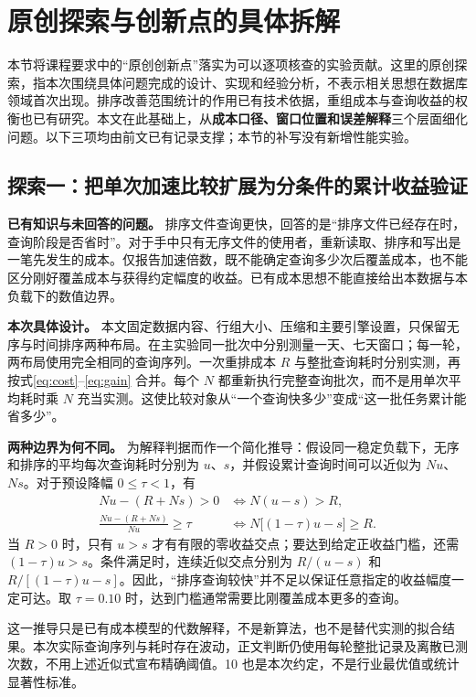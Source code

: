 \section{原创探索与创新点的具体拆解}
\label{sec:innovation}
本节将课程要求中的“原创创新点”落实为可以逐项核查的实验贡献。这里的原创探索，指本次围绕具体问题完成的设计、实现和经验分析，不表示相关思想在数据库领域首次出现。排序改善范围统计的作用已有技术依据，重组成本与查询收益的权衡也已有研究\cite{duckdb,rong}。本文在此基础上，从\textbf{成本口径、窗口位置和误差解释}三个层面细化问题。以下三项均由前文已有记录支撑；本节的补写没有新增性能实验。

\subsection{探索一：把单次加速比较扩展为分条件的累计收益验证}
\label{sec:innovation-cost}
\textbf{已有知识与未回答的问题。}
排序文件查询更快，回答的是“排序文件已经存在时，查询阶段是否省时”。对于手中只有无序文件的使用者，重新读取、排序和写出是一笔先发生的成本。仅报告加速倍数，既不能确定查询多少次后覆盖成本，也不能区分刚好覆盖成本与获得约定幅度的收益。已有成本思想不能直接给出本数据与本负载下的数值边界。

\textbf{本次具体设计。}
本文固定数据内容、行组大小、压缩和主要引擎设置，只保留无序与时间排序两种布局。在主实验同一批次中分别测量一天、七天窗口；每一轮，两布局使用完全相同的查询序列。一次重排成本 $R$ 与整批查询耗时分别实测，再按式\eqref{eq:cost}--\eqref{eq:gain} 合并。每个 $N$ 都重新执行完整查询批次，而不是用单次平均耗时乘 $N$ 充当实测。这使比较对象从“一个查询快多少”变成“这一批任务累计能省多少”。

\textbf{两种边界为何不同。}
为解释判据而作一个简化推导：假设同一稳定负载下，无序和排序的平均每次查询耗时分别为 $u$、$s$，并假设累计查询时间可以近似为 $Nu$、$Ns$。对于预设降幅 $0\le\tau<1$，有
\begin{align}
Nu-(R+Ns)>0 &\iff N(u-s)>R,\label{eq:innovation-zero}\\
\frac{Nu-(R+Ns)}{Nu}\ge\tau
 &\iff N\bigl[(1-\tau)u-s\bigr]\ge R.\label{eq:innovation-target}
\end{align}
当 $R>0$ 时，只有 $u>s$ 才有有限的零收益交点；要达到给定正收益门槛，还需 $(1-\tau)u>s$。条件满足时，连续近似交点分别为 $R/(u-s)$ 和 $R/[(1-\tau)u-s]$。因此，“排序查询较快”并不足以保证任意指定的收益幅度一定可达。取 $\tau=0.10$ 时，达到门槛通常需要比刚覆盖成本更多的查询。

这一推导只是已有成本模型的代数解释，不是新算法，也不是替代实测的拟合结果。本次实际查询序列与耗时存在波动，正文判断仍使用每轮整批记录及离散已测次数，不用上述近似式宣布精确阈值。10\pct{} 也是本次约定，不是行业最优值或统计显著性标准。


